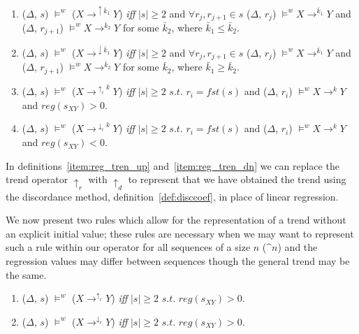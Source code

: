 \begin{enumerate}

\item\label{item:ma_inc}($\Delta$, $s$) $\models^w$ ($X
\to^{\uparrow\bar{k}_1} Y$) { \em iff } $\mid s \mid \ge 2$ and $ \forall r_{j},r_{j+1} \in
s$ ($\Delta$, $r_j$) 
$\models^w X \to^{\bar{k}_1} Y$ and ($\Delta$, $r_{j+1}$) 
$\models^w X \to^{\bar{k}_2} Y$ for some $\bar{k}_2$, where $\bar{k}_1 \le
\bar{k}_2$.



\item\label{item:ma_dec}($\Delta$, $s$) $\models^w$ ($X
\to^{\downarrow\bar{k}_1} Y$) { \em iff } $\mid s \mid \ge 2$ and $ \forall r_{j},r_{j+1} \in
s$ ($\Delta$, $r_j$) 
$\models^w X \to^{\bar{k}_1} Y$ and ($\Delta$, $r_{j+1}$) 
$\models^w X \to^{\bar{k}_2} Y$  for some $\bar{k}_2$, where $\bar{k}_1 \ge
\bar{k}_2$.  


\item\label{item:reg_tren_up}($\Delta$, $s$) $\models^w$ ($X
\to^{\uparrow_{r}{k}} Y$) { \em iff } $\mid s \mid \ge 2$ $s.t.$ $r_i
= fst(s)$ and 
($\Delta$, $r_i$)  $\models^w X \to^{k} Y$ and $reg(s_{XY}) > 0$.


\item\label{item:reg_tren_dn}($\Delta$, $s$) $\models^w$ ($X
\to^{\downarrow_{r}{k}} Y$) { \em iff } $\mid s \mid \ge 2$ $s.t.$
$r_i = fst(s)$ and 
($\Delta$, $r_i$)  $\models^w X \to^{k} Y$ and $reg(s_{XY}) < 0$. 

\end{enumerate}

In definitions~\ref{item:reg_tren_up} and~\ref{item:reg_tren_dn} we
can replace the trend operator $\uparrow_r$ with $\uparrow_d$ to
represent that we have obtained the trend using the discordance
method, definition~\ref{def:disccoef}, in place of linear regression.

We now present two rules which allow for the representation of a trend
without an explicit initial value; these rules are necessary when we
may want to represent such a rule within our operator for all
sequences of a size $n$ ($\bm^n$) and the regression values may differ
between sequences though the general trend may be the same.

\begin{enumerate}

\item\label{item:tren_up}($\Delta$, $s$) $\models^w$ ($X
\to^{\uparrow_r} Y$) { \em iff } $\mid s \mid \ge 2$ $s.t.$
 $reg(s_{XY}) > 0$.


\item\label{item:tren_dn}($\Delta$, $s$) $\models^w$ ($X
\to^{\downarrow_r} Y$) { \em iff } $\mid s \mid \ge 2$ $s.t.$
 $reg(s_{XY}) > 0$.

\end{enumerate}



